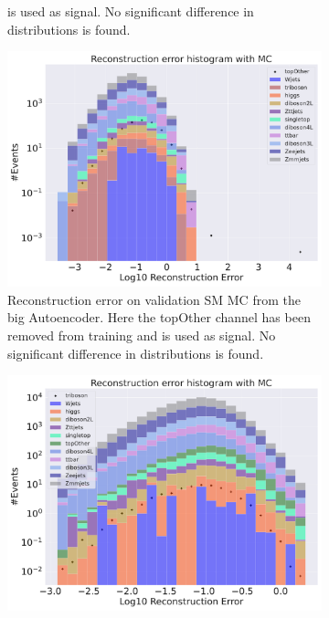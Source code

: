 \begin{figure}[H]
\begin{subfigure}{.45\textwidth}
{        is used as signal. No significant difference in distributions is found. }
        \label{fig:vae_small_topOther}
    \end{subfigure}
    \hfill
    \begin{subfigure}{.45\textwidth}
        \includegraphics[width=\textwidth]{Figures/VAE_testing/big/b_data_recon_big_rm3_feats_sig_topOther.pdf}
        \caption{Reconstruction error on validation SM MC from the big Autoencoder. Here the topOther channel has been removed from training and 
        is used as signal. No significant difference in distributions is found. }
        \label{fig:vae_big_topOther}
    \end{subfigure}
    \hfill
    \begin{subfigure}{.45\textwidth}
        \includegraphics[width=\textwidth]{Figures/VAE_testing/small/b_data_recon_big_rm3_feats_sig_triboson.pdf}

\end{subfigure}
\end{figure}
